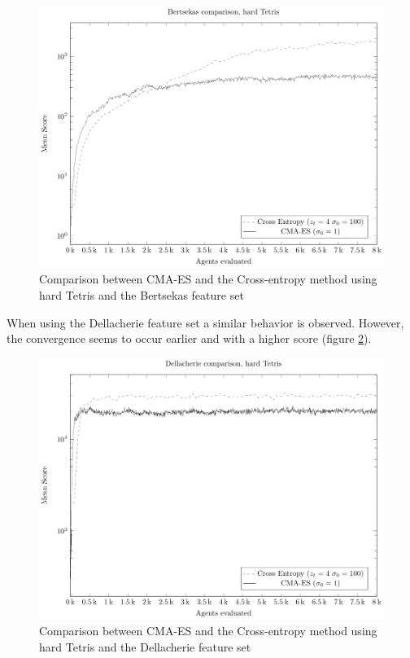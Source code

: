 \begin{figure}[H]
\begin{center}
\includegraphics[scale=0.8]{plots/plotBertsekasCmaVsCEHardTetris}
\end{center}
\caption{Comparison between CMA-ES and the Cross-entropy method
using hard Tetris and the Bertsekas feature set 
\label{fig:featuresetCompareBertsekas}}
\end{figure}

When using the Dellacherie feature set a similar behavior is observed.
However, the convergence seems to occur earlier and with a higher score
(figure \ref{fig:featuresetCompareDellacherie}).

\begin{figure}[H]
\begin{center}
\includegraphics[scale=0.8]{plots/plotDellCmaVsCEHardTetris}
\end{center}
\caption{Comparison between CMA-ES and the Cross-entropy method 
using hard Tetris and the Dellacherie feature set
\label{fig:featuresetCompareDellacherie}}
\end{figure}

